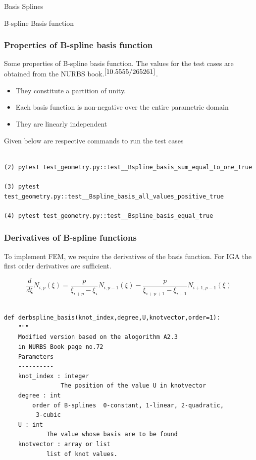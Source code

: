 \documentclass[a4paper,12pt,times]{article}
\begin{document}
\begin{section}{Basis Splines}
\begin{subsection}{B-spline Basis function}
\subsubsection{Properties of B-spline basis function}

Some properties of B-spline basis function. The values for the test cases are obtained from the NURBS book.$^{\cite{10.5555/265261}}$.
\begin{itemize}
\item They constitute a partition of unity.


\item Each basis function is non-negative over the entire parametric domain

\item They are linearly independent
\end{itemize}
Given below are respective commands to run the test cases
\begin{lstlisting} 

(2) pytest test_geometry.py::test__Bspline_basis_sum_equal_to_one_true

(3) pytest test_geometry.py::test__Bspline_basis_all_values_positive_true

(4) pytest test_geometry.py::test__Bspline_basis_equal_true
\end{lstlisting}

\subsubsection{Derivatives of B-spline functions}
To implement FEM, we require the derivatives of the basis function. For IGA the first order derivatives are sufficient.

\begin{equation}\label{B-spline Derivative}
\frac{d}{d \xi} N_{i, p}(\xi)=\frac{p}{\xi_{i+p}-\xi_{i}} N_{i, p-1}(\xi)-\frac{p}{\xi_{i+p+1}-\xi_{i+1}} N_{i+1, p-1}(\xi)
\end{equation}  
\begin{lstlisting}

def derbspline_basis(knot_index,degree,U,knotvector,order=1):
    """
    Modified version based on the alogorithm A2.3 
    in NURBS Book page no.72
    Parameters
    ----------
    knot_index : integer
                The position of the value U in knotvector
    degree : int
        order of B-splines  0-constant, 1-linear, 2-quadratic,
         3-cubic
    U : int
            The value whose basis are to be found
    knotvector : array or list
            list of knot values.
            

\end{lstlisting}
\end{subsection}
\end{section}
\end{document}
